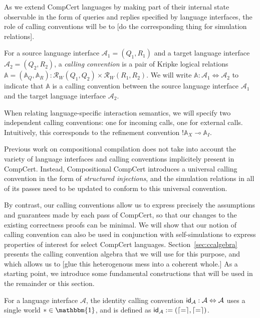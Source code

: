As we extend CompCert languages
by making part of their internal state observable
in the form of queries and replies specified by language interfaces,
the role of calling conventions
will be to [do the corresponding thing for simulation relations].

\begin{definition}
For a source language interface $\mathcal{A}_1 = (Q_1, R_1)$ and
a target language interface $\mathcal{A}_2 = (Q_2, R_2)$,
a \emph{calling convention}
is a pair of Kripke logical relations
$\mathbb{A} = (\mathbb{A}_Q, \mathbb{A}_R) :
 \mathcal{R}_W(Q_1, Q_2) \times \mathcal{R}_W(R_1, R_2)$.
We will write $\mathbb{A} : \mathcal{A}_1 \Leftrightarrow \mathcal{A}_2$
to indicate that $\mathbb{A}$ is a calling convention between
the source language interface $\mathcal{A}_1$ and
the target language interface $\mathcal{A}_2$.
\end{definition}

When relating language-specific interaction semantics,
we will specify two independent calling conventions:
one for incoming calls, one for external calls.
Intuitively,
this corresponds to the refinement convention
$!\mathbb{A}_X \multimap \mathbb{A}_I$.

Previous work on compositional compilation \cite{compcompcert}
does not take into account the variety of language interfaces
and calling conventions implicitely present in CompCert.
Instead,
Compositional CompCert introduces a universal calling convention
in the form of \emph{structured injections},
and the simulation relations in all of its passes
need to be updated to conform to this universal convention.

By contrast,
our calling conventions
allow us to express precisely the assumptions and guarantees
made by each pass of CompCert,
so that our changes to the existing correctness proofs
can be minimal.
We will show that our notion of calling convention
can also be used in conjunction with self-simulations
to express properties of interest for
select CompCert languages.
Section~\ref{sec:ccalgebra}
presents the calling convention algebra that we will use
for this purpose, and
which allows us to [glue this heterogenous mess into a coherent whole.]
As a starting point,
we introduce some fundamental constructions that will be used
in the remainder or this section.

\begin{definition}
For a language interface $\mathcal{A}$,
the identity calling convention
$ \textsf{id} _\mathcal{A} : \mathcal{A} \Leftrightarrow \mathcal{A}$
uses a single world $* \in \mathbbm{1}$,
and is defined as $ \textsf{id} _\mathcal{A} := (\lceil {=} \rceil, \lceil {=} \rceil)$.
\end{definition}

